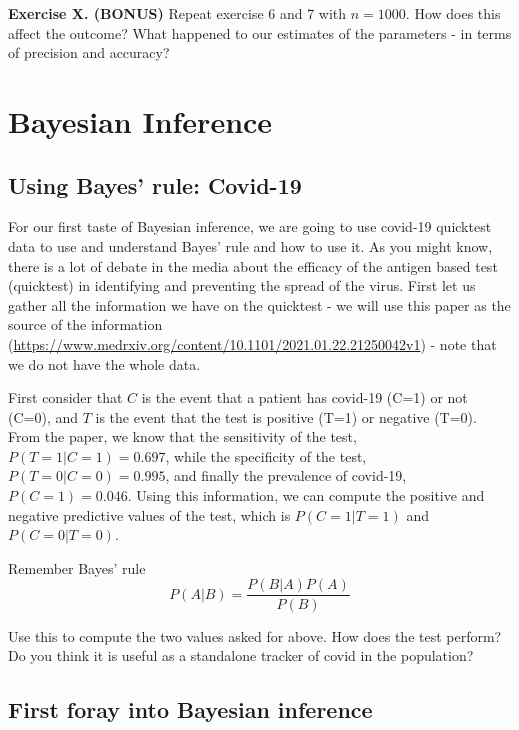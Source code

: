 \documentclass[
]{book}
\begin{document}
\textbf{Exercise X. (BONUS)} Repeat exercise 6 and 7 with \(n=1000\). How does this affect the outcome? What happened to our estimates of the parameters - in terms of precision and accuracy?

\hypertarget{bayesian-inference}{%
\chapter{Bayesian Inference}\label{bayesian-inference}}

\hypertarget{using-bayes-rule-covid-19}{%
\section{Using Bayes' rule: Covid-19}\label{using-bayes-rule-covid-19}}

For our first taste of Bayesian inference, we are going to use covid-19 quicktest data to use and understand Bayes' rule and how to use it. As you might know, there is a lot of debate in the media about the efficacy of the antigen based test (quicktest) in identifying and preventing the spread of the virus. First let us gather all the information we have on the quicktest - we will use this paper as the source of the information (\url{https://www.medrxiv.org/content/10.1101/2021.01.22.21250042v1}) - note that we do not have the whole data.

First consider that \(C\) is the event that a patient has covid-19 (C=1) or not (C=0), and \(T\) is the event that the test is positive (T=1) or negative (T=0).
From the paper, we know that the sensitivity of the test, \(P(T=1 | C=1) = 0.697\), while the specificity of the test, \(P(T=0 | C=0) = 0.995\), and finally the prevalence of covid-19, \(P(C=1) = 0.046\). Using this information, we can compute the positive and negative predictive values of the test, which is \(P(C=1 | T=1)\) and \(P(C=0 | T=0)\).

Remember Bayes' rule \[P(A|B) = \frac{P(B|A)P(A)}{P(B)}\]

Use this to compute the two values asked for above. How does the test perform? Do you think it is useful as a standalone tracker of covid in the population?

\hypertarget{first-foray-into-bayesian-inference}{%
\section{First foray into Bayesian inference}\label{first-foray-into-bayesian-inference}}
\end{document}
